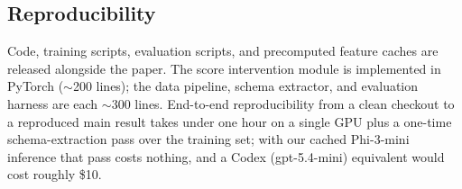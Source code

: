 \subsection{Reproducibility}

Code, training scripts, evaluation scripts, and precomputed feature caches are released alongside the paper. The score intervention module is implemented in PyTorch ($\sim$200 lines); the data pipeline, schema extractor, and evaluation harness are each $\sim$300 lines. End-to-end reproducibility from a clean checkout to a reproduced main result takes under one hour on a single GPU plus a one-time schema-extraction pass over the training set; with our cached Phi-3-mini inference that pass costs nothing, and a Codex (gpt-5.4-mini) equivalent would cost roughly \$10.
